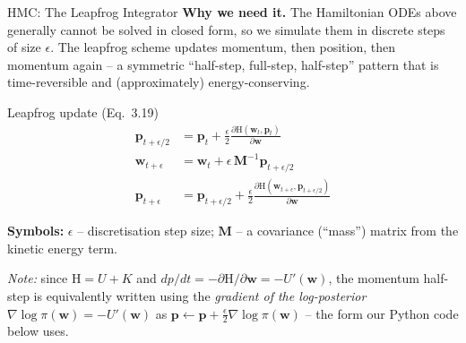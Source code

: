 \documentclass[aspectratio=169,10pt]{beamer}
\newcommand{\bw}{\mathbf{w}}
\newcommand{\bp}{\mathbf{p}}
\newcommand{\Ham}{\mathrm{H}}
\begin{document}
\begin{frame}{HMC: The Leapfrog Integrator}
  \textbf{Why we need it.} The Hamiltonian ODEs above generally cannot be
  solved in closed form, so we simulate them in discrete steps of size
  $\epsilon$. The leapfrog scheme updates momentum, then position, then
  momentum again -- a symmetric ``half-step, full-step, half-step'' pattern
  that is time-reversible and (approximately) energy-conserving.

  \begin{block}{Leapfrog update (Eq.~3.19)}
  \begin{align}
    \bp_{t+\epsilon/2} &= \bp_t + \frac{\epsilon}{2}\frac{\partial \Ham(\bw_t,\bp_t)}{\partial \bw} \\
    \bw_{t+\epsilon} &= \bw_t + \epsilon\, \mathbf{M}^{-1} \bp_{t+\epsilon/2} \\
    \bp_{t+\epsilon} &= \bp_{t+\epsilon/2} + \frac{\epsilon}{2}\frac{\partial \Ham(\bw_{t+\epsilon},\bp_{t+\epsilon/2})}{\partial \bw}
  \end{align}
  \end{block}
  \textbf{Symbols:} $\epsilon$ -- discretisation step size; $\mathbf{M}$ -- a
  covariance (``mass'') matrix from the kinetic energy term.

  \vspace{1mm}
  \footnotesize\emph{Note:} since $\Ham=U+K$ and $dp/dt=-\partial \Ham/\partial \bw = -U'(\bw)$,
  the momentum half-step is equivalently written using the \emph{gradient of
  the log-posterior} $\nabla\log\pi(\bw)= -U'(\bw)$ as $\bp \leftarrow \bp + \tfrac{\epsilon}{2}\nabla\log\pi(\bw)$ -- the form our Python code below uses.
\end{frame}
\end{document}
